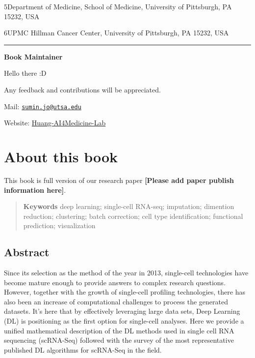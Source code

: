 \documentclass[
]{book}
\begin{document}
5Department of Medicine, School of Medicine, University of Pittsburgh, PA 15232, USA

6UPMC Hillman Cancer Center, University of Pittsburgh, PA 15232, USA

\begin{center}\rule{0.5\linewidth}{0.5pt}\end{center}

\textbf{Book Maintainer}

Hello there :D

Any feedback and contributions will be appreciated.

Mail: \href{mailto:sumin.jo@utsa.edu}{\nolinkurl{sumin.jo@utsa.edu}}

Website: \href{https://github.com/Huang-AI4Medicine-Lab}{Huang-AI4Medicine-Lab}

\hypertarget{about-this-book}{%
\chapter*{About this book}\label{about-this-book}}

This book is full version of our research paper \textbf{{[}Please add paper publish information here{]}}.

\begin{quote}
\textbf{Keywords}
deep learning; single-cell RNA-seq; imputation; dimention reduction; clustering; batch correction; cell type identification; functional prediction; visualization
\end{quote}

\hypertarget{abstract}{%
\section*{Abstract}\label{abstract}}

Since its selection as the method of the year in 2013, single-cell technologies have become mature enough to provide answers to complex research questions. However, together with the growth of single-cell profiling technologies, there has also been an increase of computational challenges to process the generated datasets. It's here that by effectively leveraging large data sets, Deep Learning (DL) is positioning as the first option for single-cell analyses. Here we provide a unified mathematical description of the DL methods used in single cell RNA sequencing (scRNA-Seq) followed with the survey of the most representative published DL algorithms for scRNA-Seq in the field.
\end{document}
